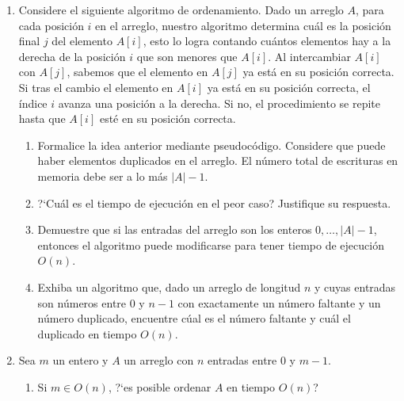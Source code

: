 \documentclass{article}
\begin{document}
\begin{enumerate}
\begin{enumerate}
            por lo que el algoritmo nunca realiza intercambios ni decrementa $i$.
            El índice solo va avanzando desde 0 hasta $|A| = n$

            Por lo tanto, el tiempo de ejecución en el mejor caso es

            $
            \Theta(n).
            $



        \end{enumerate}

     

    \item Considere el siguiente algoritmo de ordenamiento.   Dado un arreglo
        $A$, para cada posici\'on $i$ en el arreglo, nuestro algoritmo determina
        cu\'al es la posici\'on final $j$ del elemento $A[i]$, esto lo logra
        contando cu\'antos elementos hay a la derecha de la posici\'on $i$ que
        son menores que $A[i]$.   Al intercambiar $A[i]$ con $A[j]$, sabemos que
        el elemento en $A[j]$ ya est\'a en su posici\'on correcta.  Si tras el
        cambio el elemento en $A[i]$ ya est\'a en su posici\'on correcta, el
        \'indice $i$ avanza una posici\'on a la derecha.    Si no, el
        procedimiento se repite hasta que $A[i]$ esté en su posici\'on correcta.
        \begin{enumerate}
            \item Formalice la idea anterior mediante pseudoc\'odigo. Considere
                que puede haber elementos duplicados en el arreglo. El n\'umero
                total de escrituras en memoria debe ser a lo m\'as $|A|-1$.
            \item ?`Cu\'al es el tiempo de ejecuci\'on en el peor caso?
                Justifique su respuesta.
            \item Demuestre que si las entradas del arreglo son los enteros $0,
                \dots, |A|-1$, entonces el algoritmo puede modificarse para
                tener tiempo de ejecuci\'on $O(n)$.
            \item Exhiba un algoritmo que, dado un arreglo de longitud $n$ y
                cuyas entradas son n\'umeros entre $0$ y $n-1$ con exactamente
                un n\'umero faltante y un n\'umero duplicado, encuentre c\'ual
                es el n\'umero faltante y cu\'al el duplicado en tiempo $O(n)$.
        \end{enumerate}

    \item Sea $m$ un entero y $A$ un arreglo con $n$ entradas entre $0$ y $m-1$.
        \begin{enumerate}
            \item Si $m \in O(n)$, ?`es posible ordenar $A$ en tiempo $O(n)$?
            

\end{enumerate}
\end{enumerate}
\end{document}
